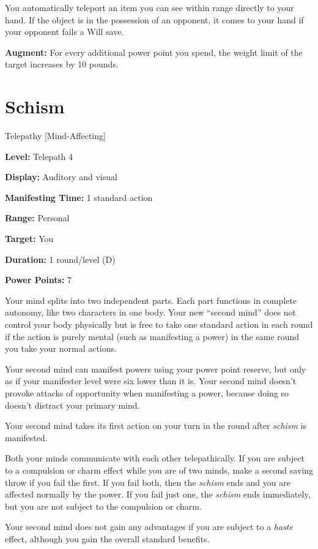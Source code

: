 \documentclass{article}
\begin{document}
You automatically teleport an item you can see within range directly to your hand. 
If the object is in the possession of an opponent, it comes to your hand if your 
opponent fails a Will save.

\textbf{Augment:} For every additional power point you spend, the weight limit 
of the target increases by 10 pounds.

\vspace{12pt}
\section*{Schism}

Telepathy [Mind-Affecting]

\textbf{Level:} Telepath 4

\textbf{Display:} Auditory and visual

\textbf{Manifesting Time:} 1 standard action

\textbf{Range:} Personal

\textbf{Target:} You

\textbf{Duration:} 1 round/level (D)

\textbf{Power Points:} 7

Your mind splits into two independent parts. Each part functions in complete autonomy, 
like two characters in one body. Your new ``second mind'' does not control your 
body physically but is free to take one standard action in each round if the action 
is purely mental (such as manifesting a power) in the same round you take your 
normal actions.

Your second mind can manifest powers using your power point reserve, but only as 
if your manifester level were six lower than it is. Your second mind doesn't provoke 
attacks of opportunity when manifesting a power, because doing so doesn't distract 
your primary mind.

Your second mind takes its first action on your turn in the round after \textit{schism 
}is manifested.

Both your minds communicate with each other telepathically. If you are subject 
to a compulsion or charm effect while you are of two minds, make a second saving 
throw if you fail the first. If you fail both, then the \textit{schism }ends and 
you are affected normally by the power. If you fail just one, the \textit{schism 
}ends immediately, but you are not subject to the compulsion or charm.

Your second mind does not gain any advantages if you are subject to a \textit{haste 
}effect, although you gain the overall standard benefits.
\end{document}
